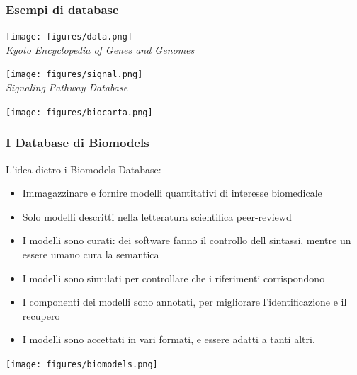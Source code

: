 \documentclass{article}
\begin{document}
\subsubsection*{Esempi di database}
\begin{minipage}[t]{.5\textwidth}
    \raggedright
    \texttt{[image: figures/data.png]}\\
    \textit{Kyoto Encyclopedia of Genes and Genomes}
\end{minipage}%
\begin{minipage}[t]{.5\textwidth}
    \raggedleft
    \texttt{[image: figures/signal.png]}\\
    \textit{Signaling Pathway Database}\\
\end{minipage}
\begin{center}
    \texttt{[image: figures/biocarta.png]}
\end{center}

\subsubsection{I Database di Biomodels}
L'idea dietro i Biomodels Database:
\begin{itemize}
    \item Immagazzinare e fornire modelli quantitativi di interesse biomedicale
    \item Solo modelli descritti nella letteratura scientifica peer-reviewd
    \item I modelli sono curati: dei software fanno il controllo dell sintassi, mentre un essere umano cura la semantica
    \item I modelli sono simulati per controllare che i riferimenti corrispondono
    \item I componenti dei modelli sono annotati, per migliorare l'identificazione e il recupero
    \item I modelli sono accettati in vari formati, e essere adatti a tanti altri.
\end{itemize}
\begin{center}
    \texttt{[image: figures/biomodels.png]}
\end{center}
\end{document}
